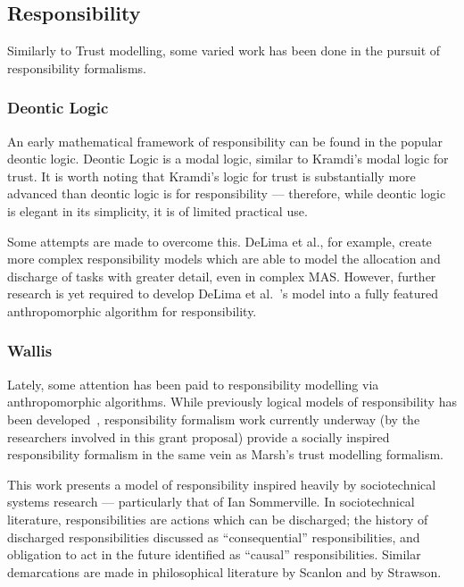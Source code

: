 \subsection{Responsibility}
Similarly to Trust modelling, some varied work has been done in the pursuit of responsibility formalisms.

\subsubsection{Deontic Logic}

An early mathematical framework of responsibility can be found in the popular deontic logic\cite{deontic-logic}. Deontic Logic is a modal logic, similar to Kramdi's modal logic for trust.\cite{kramdi} It is worth noting that Kramdi's logic for trust is substantially more advanced than deontic logic is for responsibility --- therefore, while deontic logic is elegant in its simplicity, it is of limited practical use.\par

Some attempts are made to overcome this. DeLima et al., for example, create more complex responsibility models which are able to model the allocation and discharge of tasks with greater detail, even in complex MAS.\cite{DeLima2008} However, further research is yet required to develop DeLima et al.~'s model into a fully featured anthropomorphic algorithm for responsibility.

\subsubsection*{Wallis}
Lately, some attention has been paid to responsibility modelling via anthropomorphic algorithms.\cite{wallis2017} While previously logical models of responsibility has been developed~\cite{berreby2015modelling}, responsibility formalism work currently underway (by the researchers involved in this grant proposal) provide a socially inspired responsibility formalism in the same vein as Marsh's trust modelling formalism.\par

This work presents a model of responsibility inspired heavily by sociotechnical systems research --- particularly that of Ian Sommerville\cite{Sommerville:2007ec}. In sociotechnical literature, responsibilities are actions which can be discharged; the history of discharged responsibilities discussed as ``consequential'' responsibilities, and obligation to act in the future identified as ``causal'' responsibilities. Similar demarcations are made in philosophical literature by Scanlon\cite{scanlon2006justice} and by Strawson\cite{strawson}.\par

